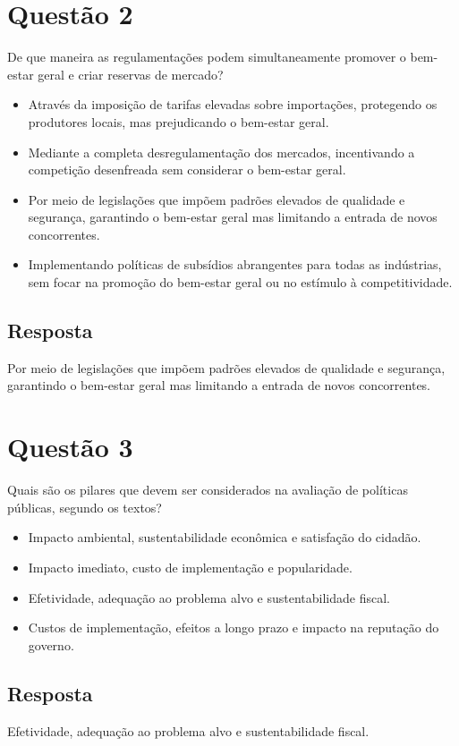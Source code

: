 \documentclass[
   article,       
   12pt,          
   oneside,       
   a4paper,       
   english,       
   brazil,        
   sumario=tradicional
   ]{abntex2}
\begin{document}
\section{Questão 2}
De que maneira as regulamentações podem simultaneamente promover o bem-estar geral e criar reservas de mercado?

\begin{itemize}
  \item Através da imposição de tarifas elevadas sobre importações, protegendo os produtores locais, mas prejudicando o bem-estar geral.
  \item Mediante a completa desregulamentação dos mercados, incentivando a competição desenfreada sem considerar o bem-estar geral.
  \item Por meio de legislações que impõem padrões elevados de qualidade e segurança, garantindo o bem-estar geral mas limitando a entrada de novos concorrentes.
  \item Implementando políticas de subsídios abrangentes para todas as indústrias, sem focar na promoção do bem-estar geral ou no estímulo à competitividade.
\end{itemize}

\subsection{Resposta}
Por meio de legislações que impõem padrões elevados de qualidade e segurança, garantindo o bem-estar geral mas limitando a entrada de novos concorrentes.

\section{Questão 3}
Quais são os pilares que devem ser considerados na avaliação de políticas públicas, segundo os textos?

\begin{itemize}
  \item Impacto ambiental, sustentabilidade econômica e satisfação do cidadão.
  \item Impacto imediato, custo de implementação e popularidade.
  \item Efetividade, adequação ao problema alvo e sustentabilidade fiscal.
  \item Custos de implementação, efeitos a longo prazo e impacto na reputação do governo.
\end{itemize}

\subsection{Resposta}
Efetividade, adequação ao problema alvo e sustentabilidade fiscal.
\end{document}
